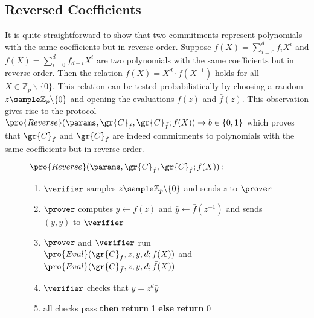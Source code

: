 \subsection{Reversed Coefficients}

It is quite straightforward to show that two commitments represent polynomials with the same coefficients but in reverse order. Suppose $f(X) = \sum_{i=0}^d f_i X^i$ and $\bar{f}(X) = \sum_{i=0}^d f_{d-i}X^i$ are two polynomials with the same coefficients but in reverse order. Then the relation $\bar{f}(X) = X^d \cdot f(X^{-1})$ holds for all $X \in \mathbb{Z}_p \backslash \{0\}$. This relation can be tested probabilistically by choosing a random $z \sample \mathbb{Z}_p \backslash \{0\}$ and opening the evaluations $f(z)$ and $\bar{f}(z)$. This observation gives rise to the protocol $\pro{Reverse}(\params, \gr{C}_f, \gr{C}_{\bar{f}}; f(X)) \rightarrow b \in \{0,1\}$ which proves that $\gr{C}_f$ and $\gr{C}_{\bar{f}}$ are indeed commitments to polynomials with the same coefficients but in reverse order.

\begin{figure}[!htp]
\noindent\begin{mdframed}[userdefinedwidth=\textwidth]
\begin{minipage}{\textwidth}
	\begin{flushleft}
	$\pro{Reverse}(\params, \gr{C}_{f}, \gr{C}_{\bar{f}}; {f}(X)):$ 
		\begin{enumerate}[nolistsep]
		    \item $\verifier$ samples $z \sample \mathbb{Z}_p \backslash \{0\}$ and sends $z$ to $\prover$
		    \item $\prover$ computes $y \leftarrow f(z)$ and $\bar{y} \leftarrow \bar{f}(z^{-1})$ and sends $(y, \bar{y})$ to $\verifier$
		    \item $\prover$ and $\verifier$ run $\pro{Eval}(\gr{C}_f, z, y, d; f(X))$ and $\pro{Eval}(\gr{C}_{\bar{f}}, z, \bar{y}, d; \bar{f}(X))$ 
		    \item $\verifier$ checks that $y = z^d \bar{y}$
		    \item \pcif{}all checks pass \textbf{then} \textbf{return} 1 \textbf{else} \textbf{return} 0
		\end{enumerate}
	\end{flushleft}
\end{minipage}
\end{mdframed}
\end{figure}

